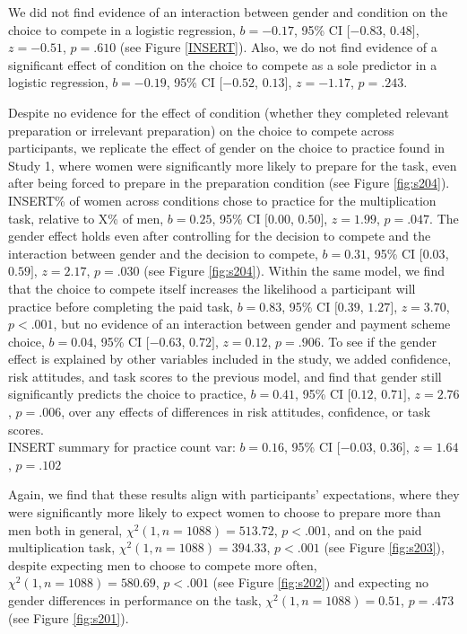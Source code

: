 \documentclass[a4paper,nobind]{templates/ociamthesis}
\begin{document}
We did not find evidence of an interaction between gender and condition on the choice to compete in a logistic regression, \(b = -0.17\), 95\% CI \([-0.83\), \(0.48]\), \(z = -0.51\), \(p = .610\) (see Figure \ref{INSERT}). Also, we do not find evidence of a significant effect of condition on the choice to compete as a sole predictor in a logistic regression, \(b = -0.19\), 95\% CI \([-0.52\), \(0.13]\), \(z = -1.17\), \(p = .243\).

Despite no evidence for the effect of condition (whether they completed relevant preparation or irrelevant preparation) on the choice to compete across participants, we replicate the effect of gender on the choice to practice found in Study 1, where women were significantly more likely to prepare for the task, even after being forced to prepare in the preparation condition (see Figure \ref{fig:s204}). INSERT\% of women across conditions chose to practice for the multiplication task, relative to X\% of men, \(b = 0.25\), 95\% CI \([0.00\), \(0.50]\), \(z = 1.99\), \(p = .047\). The gender effect holds even after controlling for the decision to compete and the interaction between gender and the decision to compete, \(b = 0.31\), 95\% CI \([0.03\), \(0.59]\), \(z = 2.17\), \(p = .030\) (see Figure \ref{fig:s204}). Within the same model, we find that the choice to compete itself increases the likelihood a participant will practice before completing the paid task, \(b = 0.83\), 95\% CI \([0.39\), \(1.27]\), \(z = 3.70\), \(p < .001\), but no evidence of an interaction between gender and payment scheme choice, \(b = 0.04\), 95\% CI \([-0.63\), \(0.72]\), \(z = 0.12\), \(p = .906\). To see if the gender effect is explained by other variables included in the study, we added confidence, risk attitudes, and task scores to the previous model, and find that gender still significantly predicts the choice to practice, \(b = 0.41\), 95\% CI \([0.12\), \(0.71]\), \(z = 2.76\), \(p = .006\), over any effects of differences in risk attitudes, confidence, or task scores.\\
INSERT summary for practice count var: \(b = 0.16\), 95\% CI \([-0.03\), \(0.36]\), \(z = 1.64\), \(p = .102\)

Again, we find that these results align with participants' expectations, where they were significantly more likely to expect women to choose to prepare more than men both in general, \(\chi^2(1, n = 1088) = 513.72\), \(p < .001\), and on the paid multiplication task, \(\chi^2(1, n = 1088) = 394.33\), \(p < .001\) (see Figure \ref{fig:s203}), despite expecting men to choose to compete more often, \(\chi^2(1, n = 1088) = 580.69\), \(p < .001\) (see Figure \ref{fig:s202}) and expecting no gender differences in performance on the task, \(\chi^2(1, n = 1088) = 0.51\), \(p = .473\) (see Figure \ref{fig:s201}).
\end{document}
